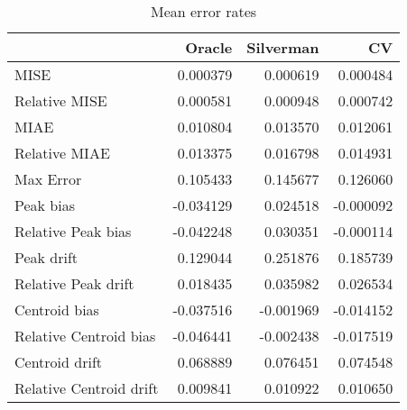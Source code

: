 \begin{table}[ht]
\centering
\begin{tabular}{lrrr}
  \hline
 & Oracle & Silverman & CV \\ 
  \hline
MISE & 0.000379 & 0.000619 & 0.000484 \\ 
  Relative MISE & 0.000581 & 0.000948 & 0.000742 \\ 
  MIAE & 0.010804 & 0.013570 & 0.012061 \\ 
  Relative MIAE & 0.013375 & 0.016798 & 0.014931 \\ 
  Max Error & 0.105433 & 0.145677 & 0.126060 \\ 
  Peak bias & -0.034129 & 0.024518 & -0.000092 \\ 
  Relative Peak bias & -0.042248 & 0.030351 & -0.000114 \\ 
  Peak drift & 0.129044 & 0.251876 & 0.185739 \\ 
  Relative Peak drift & 0.018435 & 0.035982 & 0.026534 \\ 
  Centroid bias & -0.037516 & -0.001969 & -0.014152 \\ 
  Relative Centroid bias & -0.046441 & -0.002438 & -0.017519 \\ 
  Centroid drift & 0.068889 & 0.076451 & 0.074548 \\ 
  Relative Centroid drift & 0.009841 & 0.010922 & 0.010650 \\ 
   \hline
\end{tabular}
\caption{Mean error rates} 
\label{tbl:mean_error_rates}
\end{table}
